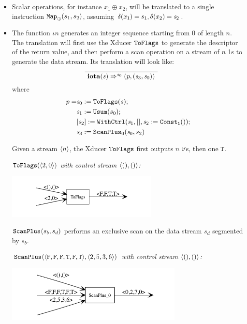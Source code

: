 \begin{itemize}
	\item Scalar operations, for instance $x_1 \oplus x_2$, will be translated to a single instruction $\map{\oplus}(s_1,s_2)$, assuming $\del(x_1) = s_1, \del(x_2) = \s_2$.
	
	\item The function $\iota{n}$  generates an integer sequence starting from 0 of length $n$.  
	The translation will first use the Xducer $\toflag$ to generate the descriptor of the return value, and then perform a scan operation on a stream of $n$ 1s to generate the data stream.
	Its translation will look like: 
	$$	\PT{
		\Axiom{\Transf{\iotan}{\s}{\s_0}{}{\sfun{p} {(\s_3,\s_0)}}}
	}$$
	where 
	\begin{align*}
			p= & \sdef{\s_0}{\toflag(\s)} ; \\ 
			& \sdef{\s_1}{\usum(s_0)} ; \\
			& \withctrl{\s_1}{\sdef{\s_2}{\consta{1}()}}{[]}{[\s_2]}; \\
			& \sdef{\s_3}{\scan_{0}(\s_0,s_2)}
		\end{align*}

Given a stream $\singl{n}$, the Xducer $\toflag$ first outputs $n$ $\F$s, then one $\T$.

\begin{example} \emph{$\toflagf{\<2,0\'>}$  with control stream $\<(),()\'>$:}\\
	\begin{center}
		\includegraphics[width=0.6\textwidth]{fig/toflag.png}
	\end{center}
\end{example}

$\scan_{}(s_b,s_d)$ performs an exclusive scan on the data stream $s_d$ segmented by $s_b$.
\begin{example} \emph{$\scan_{}(\<\F,\F,\F,\T,\F,\T\'>, \< 2,5,3,6 \'>)$  with control stream $\<(),()\'>$: }\\
	\begin{center}
		\includegraphics[width=0.7\textwidth]{fig/scan.png}
	\end{center}
\end{example}




\end{itemize}
